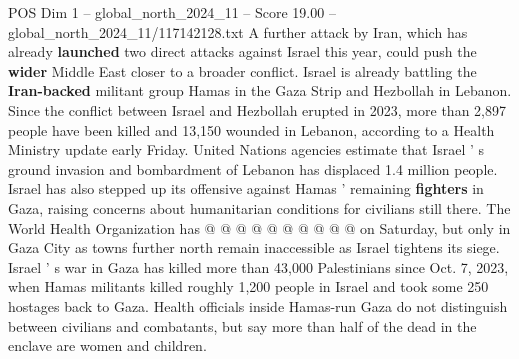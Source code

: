 \begin{textsample}{POS Dim 1 – global\_north\_2024\_11 – Score 19.00 – global\_north\_2024\_11/117142128.txt}
A further attack by Iran, which has already \textbf{launched} two direct attacks against Israel this year, could push the \textbf{wider} Middle East closer to a broader conflict.
Israel is already battling the \textbf{Iran-backed} militant group Hamas in the Gaza Strip and Hezbollah in Lebanon.
Since the conflict between Israel and Hezbollah erupted in 2023, more than 2,897 people have been killed and 13,150 wounded in Lebanon, according to a Health Ministry update early Friday.
United Nations agencies estimate that Israel ' s ground invasion and bombardment of Lebanon has displaced 1.4 million people.
Israel has also stepped up its offensive against Hamas ' remaining \textbf{fighters} in Gaza, raising concerns about humanitarian conditions for civilians still there.
The World Health Organization has @ @ @ @ @ @ @ @ @ @ on Saturday, but only in Gaza City as towns further north remain inaccessible as Israel tightens its siege.
Israel ' s war in Gaza has killed more than 43,000 Palestinians since Oct. 7, 2023, when Hamas militants killed roughly 1,200 people in Israel and took some 250 hostages back to Gaza.
Health officials inside Hamas-run Gaza do not distinguish between civilians and combatants, but say more than half of the dead in the enclave are women and children.

\end{textsample}
